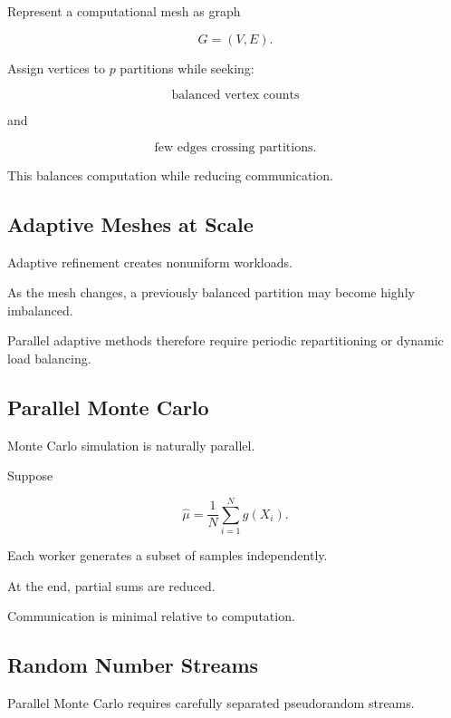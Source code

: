 Represent a computational mesh as graph

\[
G=(V,E).
\]

Assign vertices to \(p\) partitions while seeking:

\[
\boxed{
\text{balanced vertex counts}
}
\]

and

\[
\boxed{
\text{few edges crossing partitions}.
}
\]

This balances computation while reducing communication.

\subsection{Adaptive Meshes at Scale}
\label{subsec:hpmc-adaptive-meshes}

Adaptive refinement creates nonuniform workloads.

As the mesh changes, a previously balanced partition may become highly
imbalanced.

Parallel adaptive methods therefore require periodic repartitioning or
dynamic load balancing.

\subsection{Parallel Monte Carlo}
\label{subsec:hpmc-parallel-monte-carlo}

Monte Carlo simulation is naturally parallel.

Suppose

\[
\widehat{\mu}
=
\frac1N
\sum_{i=1}^{N}
g(X_i).
\]

Each worker generates a subset of samples independently.

At the end, partial sums are reduced.

Communication is minimal relative to computation.

\subsection{Random Number Streams}
\label{subsec:hpmc-random-streams}

Parallel Monte Carlo requires carefully separated pseudorandom streams.

